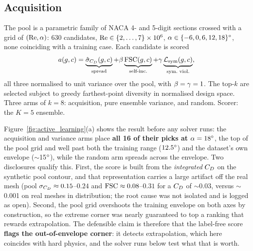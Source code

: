\subsection{Acquisition}
The pool is a parametric family of NACA 4- and 5-digit sections crossed with a
grid of $(\mathrm{Re}, \alpha)$: 630 candidates, $\mathrm{Re}\in\{2,\dots,7\}\times10^6$,
$\alpha\in\{-6,0,6,12,18\}^{\circ}$, none coinciding with a training case. Each
candidate is scored
\begin{equation}
  \acq(\geom,\cond) = \underbrace{\sigmahat_{\Cd}(\geom,\cond)}_{\text{spread}}
    + \betaacq \underbrace{\FSC(\geom,\cond)}_{\text{self-inc.}}
    + \gammaacq \underbrace{\Losssym(\geom,\cond)}_{\text{sym.\ viol.}},
\end{equation}
all three normalised to unit variance over the pool, with
$\beta = \gamma = 1$. The top-$k$ are selected subject to greedy
farthest-point diversity in normalised design space. Three arms of $k=8$:
acquisition, pure ensemble variance, and random. Scorer: the \Mtrans{} $K=5$
 ensemble.

Figure~\ref{fig:active_learning}(a) shows the result before any solver runs: the
acquisition and variance arms place \textbf{all 16 of their picks at
$\alpha=18^{\circ}$}, the top of the pool grid and well past both the training
range ($12.5^{\circ}$) and the dataset's own envelope ($\sim$15$^{\circ}$),
while the random arm spreads across the envelope. Two disclosures qualify
this. First, the score is built from the \emph{integrated} $C_D$ on the
synthetic pool contour, and that representation carries a large artifact off
the real mesh (pool $\sigma_{C_D}\approx0.15$--$0.24$ and
$\mathrm{FSC}\approx0.08$--$0.31$ for a $C_D$ of $\sim$0.03, versus $\sim$0.001 on
real meshes in distribution; the root cause was not isolated and is logged as
open). Second, the pool grid overshoots the training envelope on both axes by
construction, so the extreme corner was nearly guaranteed to top a ranking
that rewards extrapolation. The defensible claim is therefore that the
label-free score \textbf{flags the out-of-envelope corner}: it detects
extrapolation, which here coincides with hard physics, and the solver runs
below test what that is worth.

